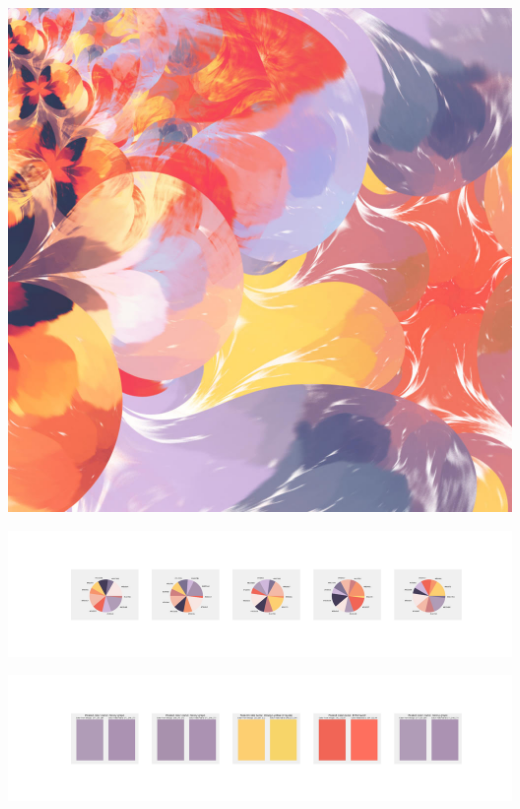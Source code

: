 \documentclass[11pt]{article}
\begin{document}
\begin{landscape}
    \begin{center}
    \includegraphics[width=\textwidth]{./nbimg/file (366).jpg}
    \end{center}

    \begin{center}
    \includegraphics[width=250mm]{./nbimg/pie-296.jpg}
    \end{center}

    \begin{center}
    \includegraphics[width=250mm]{./nbimg/peak-296.jpg}
    \end{center}
    


\end{landscape}
\end{document}
